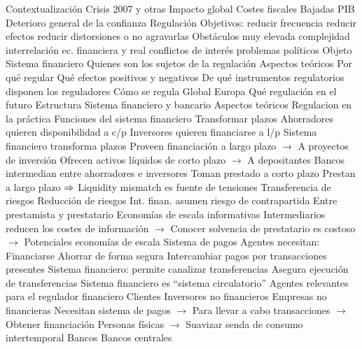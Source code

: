 \documentclass{nuevotema}
\begin{document}
\begin{esquemal}
	\1[] 
		\2 Contextualización
			\3 Crisis 2007 y otras
				\4 Impacto global
				\4 Costes fiscales
				\4 Bajadas PIB
				\4 Deterioro general de la confianza
			\3 Regulación
				\4 Objetivos:
				\4[] reducir frecuencia
				\4[] reducir efectos
				\4[] reducir distorsiones o no agravarlas
				\4 Obstáculos
				\4[] muy elevada complejidad
				\4[] interrelación ec. financiera y real
				\4[] conflictos de interés
				\4[] problemas políticos
		\2 Objeto
			\3 Sistema financiero
				\4 Quienes son los sujetos de la regulación
			\3 Aspectos teóricos
				\4 Por qué regular
				\4 Qué efectos positivos y negativos
				\4 De qué instrumentos regulatorios disponen los reguladores
			\3 Cómo se regula
				\4 Global
				\4 Europa
				\4 Qué regulación en el futuro
		\2 Estructura
			\3 Sistema financiero y bancario
			\3 Aspectos teóricos
			\3 Regulacion en la práctica
	\1 
		\2 Funciones del sistema financiero
			\3 Transformar plazos
				\4 Ahorradores quieren disponibilidad a c/p
				\4 Inversores quieren financiarse a l/p
				\4[$\then$] Sistema financiero transforma plazos
				\4[] Proveen financiación a largo plazo
				\4[] $\to$ A proyectos de inversión
				\4[] Ofrecen activos líquidos de corto plazo
				\4[] $\to$ A depositantes
				\4 Bancos intermedian entre ahorradores e inversores
				\4[] Toman prestado a corto plazo
				\4[] Prestan a largo plazo
				\4[] $\then$ Liquidity mismatch es fuente de tensiones
			\3 Transferencia de riesgos
				\4 Reducción de riesgos
				\4[] Int. finan. asumen riesgo de contrapartida
				\4[] Entre prestamista y prestatario
				\4 Economías de escala informativas
				\4[] Intermediarios reducen los costes de información
				\4[] $\to$ Conocer solvencia de prestatario es costoso
				\4[] $\to$ Potenciales economías de escala
			\3 Sistema de pagos
				\4 Agentes necesitan:
				\4[] Financiarse
				\4[] Ahorrar de forma segura
				\4[] Intercambiar pagos por transacciones presentes
				\4 Sistema financiero:
				\4[] permite canalizar transferencias
				\4[] Asegura ejecución de transferencias
				\4[$\then$] Sistema financiero es ``sistema circulatorio''
		\2 Agentes relevantes para el regulador financiero
			\3 Clientes
				\4 Inversores no financieros
				\4 Empresas no financieras
				\4[] Necesitan sistema de pagos
				\4[] $\to$ Para llevar a cabo transacciones
				\4[] $\to$ Obtener financiación
				\4 Personas físicas
				\4[] $\to$ Suavizar senda de consumo intertemporal
			\3 Bancos
				\4 Bancos centrales

\end{esquemal}
\end{document}
